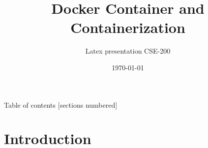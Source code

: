 \documentclass[aspectratio=1610,handout=false, tikz,border=10pt]{beamer}
\title{Docker Container and Containerization }
\subtitle{Latex presentation CSE-200}
\institute{Bangladesh University of Engineering and Technology}
\date{\today}
\begin{document}
\maketitle

\begin{frame}{Table of contents}
  [sections numbered]
  \tableofcontents[hideallsubsections]
\end{frame}



\section{Introduction}

        


\end{document}
